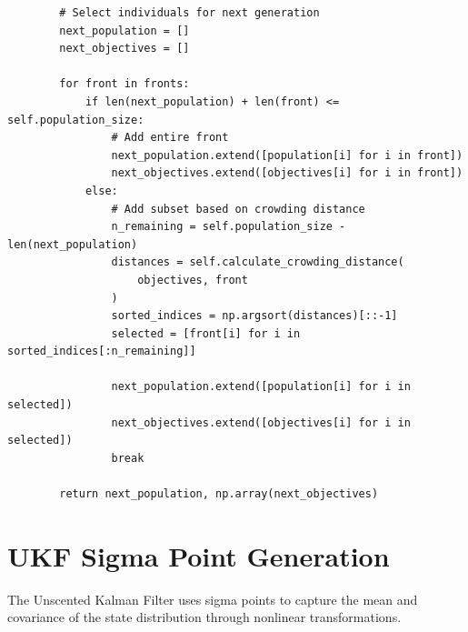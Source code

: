 \begin{lstlisting}
        # Select individuals for next generation
        next_population = []
        next_objectives = []
        
        for front in fronts:
            if len(next_population) + len(front) <= self.population_size:
                # Add entire front
                next_population.extend([population[i] for i in front])
                next_objectives.extend([objectives[i] for i in front])
            else:
                # Add subset based on crowding distance
                n_remaining = self.population_size - len(next_population)
                distances = self.calculate_crowding_distance(
                    objectives, front
                )
                sorted_indices = np.argsort(distances)[::-1]
                selected = [front[i] for i in sorted_indices[:n_remaining]]
                
                next_population.extend([population[i] for i in selected])
                next_objectives.extend([objectives[i] for i in selected])
                break
        
        return next_population, np.array(next_objectives)
\end{lstlisting}

\section{UKF Sigma Point Generation}
\label{sec:ukf_sigma}

The Unscented Kalman Filter uses sigma points to capture the mean and covariance of the state distribution through nonlinear transformations.

